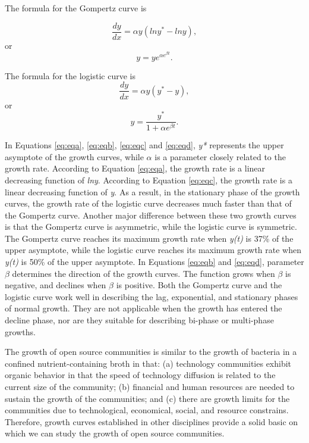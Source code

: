 \documentclass[conference]{IEEEtran}
\begin{document}
The formula for the Gompertz curve is

\begin{equation}
\label{eq:eqa}
\frac{dy}{dx} = \alpha y (ln y^{*} - ln y),
\end{equation}
or
\begin{equation}
\label{eq:eqb}
y = ye^{\alpha e^{\beta t}}.
\end{equation}

The formula for the logistic curve is
\begin{equation}
\label{eq:eqc}
\frac{dy}{dx} = \alpha y (y^{*} - y),
\end{equation}
or
\begin{equation}
\label{eq:eqd}
y = \frac{y^{*}}{1 + \alpha e^{\beta t} }.
\end{equation}


In Equations \ref{eq:eqa}, \ref{eq:eqb}, \ref{eq:eqc} and \ref{eq:eqd}, \textit{y*} represents the upper asymptote of the growth curves, while $\alpha$ is a parameter closely related to the growth rate. According to Equation \ref{eq:eqa}, the growth rate is a linear decreasing function of \textit{lny}. According to Equation \ref{eq:eqc}, the growth rate is a linear decreasing function of \textit{y}. As a result, in the stationary phase of the growth curves, the growth rate of the logistic curve decreases much faster than that of the Gompertz curve. Another major difference between these two growth curves is that the Gompertz curve is asymmetric, while the logistic curve is symmetric. The Gompertz curve reaches its maximum growth rate when \textit{y(t)} is 37\% of the upper asymptote, while the logistic curve reaches its maximum growth rate when \textit{y(t)} is 50\% of the upper asymptote. In Equations \ref{eq:eqb} and \ref{eq:eqd}, parameter $\beta$ determines the direction of the growth curves. The function grows when $\beta$ is negative, and declines when $\beta$ is positive. Both the Gompertz curve and the logistic curve work well in describing the lag, exponential, and stationary phases of normal growth. They are not applicable when the growth has entered the decline phase, nor are they suitable for describing bi-phase or multi-phase growths. 


The growth of open source communities is similar to the growth of bacteria in a confined nutrient-containing broth in that: (a) technology communities exhibit organic behavior in that the speed of technology diffusion is related to the current size of the community; (b) financial and human resources are needed to sustain the growth of the communities; and (c) there are growth limits for the communities due to technological, economical, social, and resource constrains. Therefore, growth curves established in other disciplines provide a solid basic on which we can study the growth of open source communities. 
\end{document}

